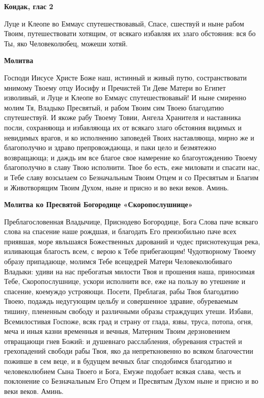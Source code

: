 \medskip


\bfseries Кондак, глас 2\normalfont{}\nopagebreak


Луце и Клеопе во Еммаус спутешествовавый, Спасе, сшествуй и ныне рабом Твоим, путешествовати хотящим, от всякаго избавляя их злаго обстояния: вся бо Ты, яко Человеколюбец, можеши хотяй.


\medskip


\bfseries Молитва\normalfont{}\nopagebreak


Господи Иисусе Христе Боже наш, истинный и живый путю, состранствовати мнимому Твоему отцу Иосифу и Пречистей Ти Деве Матери во Египет изволивый, и Луце и Клеопе во Еммаус спутешествовавый! И ныне смиренно молим Тя, Владыко Пресвятый, и рабом Твоим сим Твоею благодатию спутешествуй. И якоже рабу Твоему Товии, Ангела Хранителя и наставника посли, сохраняюща и избавляюща их от всякаго злаго обстояния видимых и невидимых врагов, и ко исполнению заповедей Твоих наставляюща, мирно же и благополучно и здраво препровождающа, и паки цело и безмятежно возвращающа; и даждь им все благое свое намерение ко благоугождению Твоему благополучно в славу Твою исполнити. Твое бо есть, еже миловати и спасати нас, и Тебе славу возсылаем со Безначальным Твоим Отцем и со Пресвятым и Благим и Животворящим Твоим Духом, ныне и присно и во веки веков. Аминь.


\medskip


\bfseries Молитва ко Пресвятой Богородице «Скоропослушнице»\normalfont{}\nopagebreak


Преблагословенная Владычице, Приснодево Богородице, Бога Слова паче всякаго слова на спасение наше рождшая, и благодать Его преизобильно паче всех приявшая, море явльшаяся Божественных дарований и чудес приснотекущая река, изливающая благость всем, с верою к Тебе прибегающим! Чудотворному Твоему образу припадающе, молимся Тебе всещедрей Матери Человеколюбиваго Владыки: удиви на нас пребогатыя милости Твоя и прошения наша, приносимая Тебе, Скоропослушнице, ускори исполнити все, еже на пользу во утешение и спасение, коемуждо устрояющи. Посети, Преблагая, рабы Твоя благодатию Твоею, подаждь недугующим цельбу и совершенное здравие, обуреваемым тишину, плененным свободу и различными образы страждущих утеши. Избави, Всемилостивая Госпоже, всяк град и страну от глада, язвы, труса, потопа, огня, меча и иныя казни временныя и вечныя, Матерним Твоим дерзновением отвращающи гнев Божий: и душевнаго расслабления, обуревания страстей и грехопадений свободи рабы Твоя, яко да непреткновенно во всяком благочестии поживше в сем веце, и в будущем вечных благ сподобимся благодатию и человеколюбием Сына Твоего и Бога, Емуже подобает всякая слава, честь и поклонение со Безначальным Его Отцем и Пресвятым Духом ныне и присно и во веки веков. Аминь.
\nopagebreak\bigskip\bigskip\mychapterending

